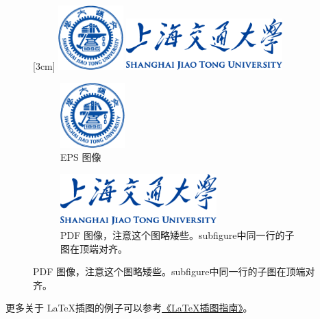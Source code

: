 \documentclass[doctor,openright,twoside]{sjtuthesis}
\theoremstyle{plain}
\theoremstyle{definition}
\theoremstyle{remark}
\theoremstyle{ocrenumbox}
\theoremstyle{plain}
\begin{document}
\begin{figure}[!htp]
  \centering
  [3cm] %
    {\includegraphics[height=2.5cm]{example/sjtulogo.eps}}
  \hspace{4em}
    {\includegraphics[height=2cm]{sjtulogo.pdf}}
  \label{fig:pdfeps-subcaptionbox}
\end{figure}

\begin{figure}[!htp]
  \centering
  \begin{subfigure}{2.5cm}
    \centering
    \includegraphics[height=2.5cm]{example/sjtulogo.eps}
    \caption{EPS 图像}
  \end{subfigure}
  \hspace{4em}
  \begin{subfigure}{0.4\textwidth}
    \centering
    \includegraphics[height=2cm]{sjtulogo.pdf}
    \caption{PDF 图像，注意这个图略矮些。subfigure中同一行的子图在顶端对齐。}
  \end{subfigure}
  \label{fig:pdfeps-subfigure}
\end{figure}

更多关于 \LaTeX 插图的例子可以参考\href{http://www.cs.duke.edu/junhu/Graphics3.pdf}{《\LaTeX 插图指南》}。
\end{document}
